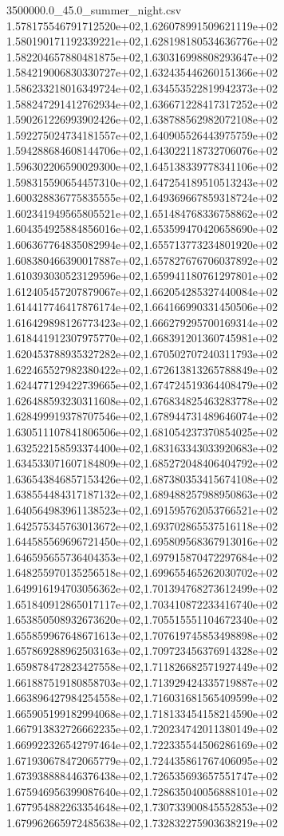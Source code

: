 \begin{filecontents*}{3500000.0_45.0_summer_night.csv}
1.578175546791712520e+02,1.626078991509621119e+02
1.580190171192339221e+02,1.628198180534636776e+02
1.582204657880481875e+02,1.630316998808293647e+02
1.584219006830330727e+02,1.632435446260151366e+02
1.586233218016349724e+02,1.634553522819942373e+02
1.588247291412762934e+02,1.636671228417317252e+02
1.590261226993902426e+02,1.638788562982072108e+02
1.592275024734181557e+02,1.640905526443975759e+02
1.594288684608144706e+02,1.643022118732706076e+02
1.596302206590029300e+02,1.645138339778341106e+02
1.598315590654457310e+02,1.647254189510513243e+02
1.600328836775835555e+02,1.649369667859318724e+02
1.602341949565805521e+02,1.651484768336758862e+02
1.604354925884856016e+02,1.653599470420658690e+02
1.606367764835082994e+02,1.655713773234801920e+02
1.608380466390017887e+02,1.657827676706037892e+02
1.610393030523129596e+02,1.659941180761297801e+02
1.612405457207879067e+02,1.662054285327440084e+02
1.614417746417876174e+02,1.664166990331450506e+02
1.616429898126773423e+02,1.666279295700169314e+02
1.618441912307975770e+02,1.668391201360745981e+02
1.620453788935327282e+02,1.670502707240311793e+02
1.622465527982380422e+02,1.672613813265788849e+02
1.624477129422739665e+02,1.674724519364408479e+02
1.626488593230311608e+02,1.676834825463283778e+02
1.628499919378707546e+02,1.678944731489646074e+02
1.630511107841806506e+02,1.681054237370854025e+02
1.632522158593374400e+02,1.683163343033920683e+02
1.634533071607184809e+02,1.685272048406404792e+02
1.636543846857153426e+02,1.687380353415674108e+02
1.638554484317187132e+02,1.689488257988950863e+02
1.640564983961138523e+02,1.691595762053766521e+02
1.642575345763013672e+02,1.693702865537516118e+02
1.644585569696721450e+02,1.695809568367913016e+02
1.646595655736404353e+02,1.697915870472297684e+02
1.648255970135256518e+02,1.699655465262030702e+02
1.649916194703056362e+02,1.701394768273612499e+02
1.651840912865017117e+02,1.703410872233416740e+02
1.653850508932673620e+02,1.705515551104672340e+02
1.655859967648671613e+02,1.707619745853498898e+02
1.657869288962503163e+02,1.709723456376914328e+02
1.659878472823427558e+02,1.711826682571927449e+02
1.661887519180858703e+02,1.713929424335719887e+02
1.663896427984254558e+02,1.716031681565409599e+02
1.665905199182994068e+02,1.718133454158214590e+02
1.667913832726662235e+02,1.720234742011380149e+02
1.669922326542797464e+02,1.722335544506286169e+02
1.671930678472065779e+02,1.724435861767406095e+02
1.673938888446376438e+02,1.726535693657551747e+02
1.675946956399087640e+02,1.728635040056888101e+02
1.677954882263354648e+02,1.730733900845552853e+02
1.679962665972485638e+02,1.732832275903638219e+02

\end{filecontents*}
